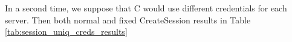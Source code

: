 \begin{table}[htb]
    \centering
    \caption{Results for fixed  sub-protocol}
    \label{tab:session_fix_results}
\end{table}

In a second time, we suppose that C would use different credentials for each server.
Then both normal and fixed CreateSession results in Table \ref{tab:session_uniq_creds_results}

